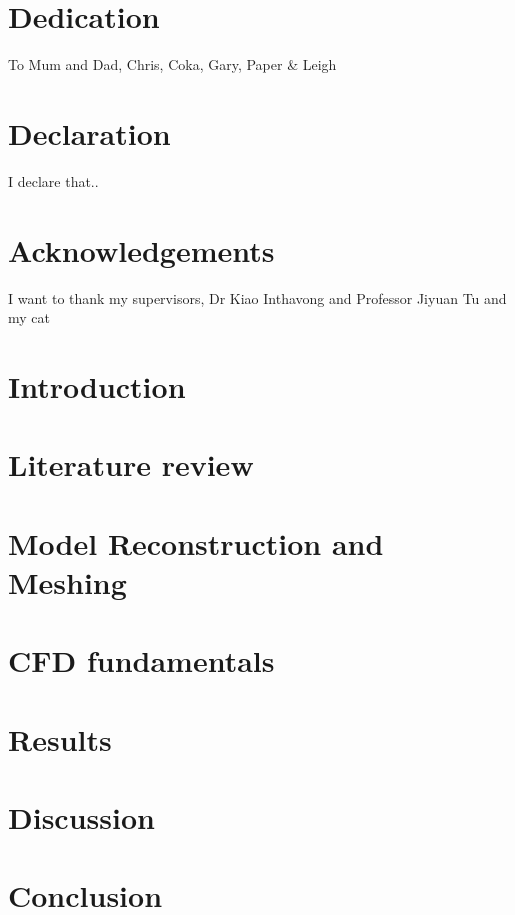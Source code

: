 \documentclass{report}
\begin{document}
\chapter*{Dedication}
To Mum and Dad, Chris, Coka, Gary, Paper \& Leigh

\chapter*{Declaration}
I declare that..

\chapter*{Acknowledgements}
I want to thank my supervisors, Dr Kiao Inthavong and Professor Jiyuan Tu and my cat

\tableofcontents

\chapter{Introduction}



\chapter{Literature review}



\chapter{Model Reconstruction and Meshing}



\chapter{CFD fundamentals} \label{cfd}



\chapter{Results}



\chapter{Discussion}



\chapter{Conclusion}






\end{document}
